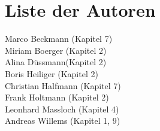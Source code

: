 \chapter*{Liste der Autoren}
Marco Beckmann (Kapitel 7) \\
Miriam Boerger (Kapitel 2)\\
Alina Düssmann(Kapitel 2)\\
Boris Heiliger (Kapitel 2)\\
Christian Halfmann (Kapitel 7)\\
Frank Holtmann (Kapitel 2)\\
Leonhard Massloch (Kapitel 4)\\
Andreas Willems (Kapitel 1, 9)
